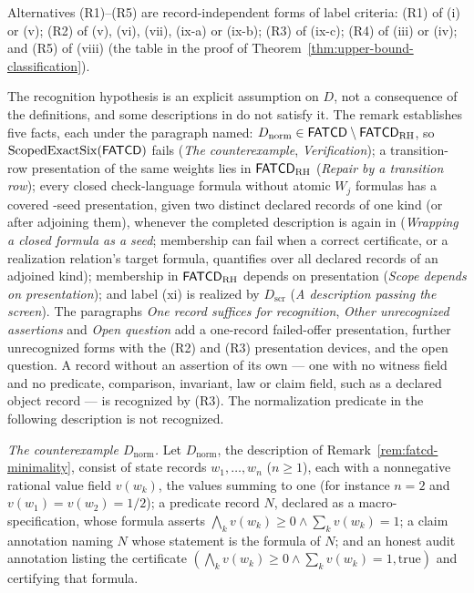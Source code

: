 Alternatives (R1)--(R5) are record-independent forms of label criteria: (R1)
of (i) or (v); (R2) of (v), (vi), (vii), (ix-a) or (ix-b); (R3) of (ix-c);
(R4) of (iii) or (iv); and (R5) of (viii) (the table in the proof of
Theorem~\ref{thm:upper-bound-classification}).

\begin{remark}\label{rem:recognition-open}
The recognition hypothesis is an explicit assumption on \(D\), not a consequence
of the \FATCD{} definitions, and some descriptions in \FATCD{} do not satisfy
it. The remark establishes five facts, each under the paragraph named:
\(D_{\mathrm{norm}}\in\mathsf{FATCD}{}\setminus\mathsf{FATCD}_{\mathrm{RH}}\), so
\(\operatorname{ScopedExactSix}\!\left(\mathsf{FATCD}{}\right)\) fails (\emph{The counterexample},
\emph{Verification}); a transition-row presentation of the same weights lies
in \(\mathsf{FATCD}_{\mathrm{RH}}\) (\emph{Repair by a transition row}); every closed
check-language formula without atomic \(W_j\) formulas has a covered
\Ptwo{}-seed presentation, given two distinct declared records of one kind (or after adjoining them), whenever the completed description is again in \FATCD{} (\emph{Wrapping a closed formula as a \Ptwo{} seed}; membership can fail when a correct certificate, or a realization relation's target formula, quantifies over all declared records of an adjoined kind);
membership in \(\mathsf{FATCD}_{\mathrm{RH}}\) depends on presentation (\emph{Scope
depends on presentation}); and label (xi) is realized by \(D_{\mathrm{scr}}\)
(\emph{A description passing the screen}). The paragraphs \emph{One record suffices for recognition}, \emph{Other unrecognized assertions} and \emph{Open question} add a one-record failed-offer presentation, further unrecognized forms with the (R2) and (R3) presentation devices, and the open question. A record without an assertion of its own --- one with no witness field and
no predicate, comparison, invariant, law or claim field, such as a declared
object record --- is recognized by (R3). The normalization predicate in the
following description is not recognized.
\par\emph{The counterexample \(D_{\mathrm{norm}}\).} Let \(D_{\mathrm{norm}}\), the description of Remark~\ref{rem:fatcd-minimality}, consist of state records \(w_1,\dots,w_n\)
(\(n\ge1\)), each with a nonnegative rational value field \(v(w_k)\), the values
summing to one (for instance \(n=2\) and \(v(w_1)=v(w_2)=1/2\)); a predicate
record \(N\), declared as a macro-specification, whose formula asserts
\(\bigwedge_k v(w_k)\ge0\wedge\sum_k v(w_k)=1\); a claim annotation naming \(N\) whose statement is the
formula of \(N\); and an honest audit annotation listing the certificate
\((\bigwedge_k v(w_k)\ge0\wedge\sum_k v(w_k)=1,\mathrm{true})\) and certifying that formula.


\end{remark}
